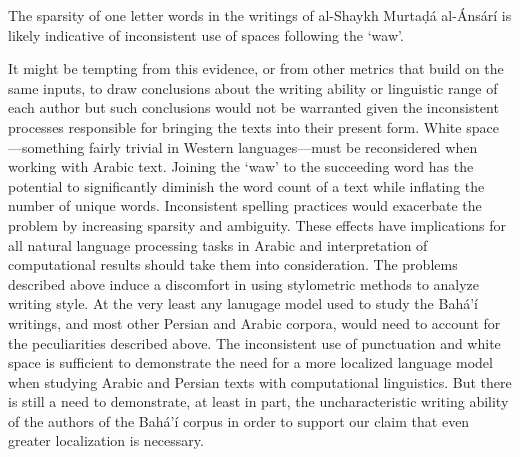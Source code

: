 \documentclass[12pt, oneside]{report}
\begin{document}
The sparsity of one letter words in the writings of al-Shaykh Murtaḍ\'{a} al-\'{A}ns\'{a}r\'{i} is likely indicative of inconsistent use of spaces following the `waw'.
\par
It might be tempting from this evidence, or from other metrics that build on the same inputs, to draw conclusions about the writing ability or linguistic range of each author but such conclusions would not be warranted given the inconsistent processes responsible for bringing the texts into their present form.
White space---something fairly trivial in Western languages---must be reconsidered when working with Arabic text.
Joining the `waw' to the succeeding word has the potential to significantly diminish the word count of a text while inflating the number of unique words.
Inconsistent spelling practices would exacerbate the problem by increasing sparsity and ambiguity.
These effects have implications for all natural language processing tasks in Arabic and interpretation of computational results should take them into consideration.
The problems described above induce a discomfort in using stylometric methods to analyze writing style. At the very least any lanugage model used to study the Bah\'{a}'\'{i} writings, and most other Persian and Arabic corpora, would need to account for the peculiarities described above. The inconsistent use of punctuation and white space is sufficient to demonstrate the need for a more localized language model when studying Arabic and Persian texts with computational linguistics. But there is still a need to demonstrate, at least in part, the uncharacteristic writing ability of the authors of the Bah\'{a}'\'{i} corpus in order to support our claim that even greater localization is necessary.
\end{document}
